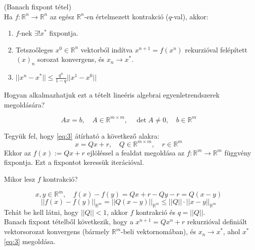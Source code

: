 \begin{tetel}(Banach fixpont tétel) \\
    Ha $f:\mathbb{R}^{n}\to \mathbb{R}^{n}$ az egész $\mathbb{R}^{n}$-en értelmezett kontrakció ($q$-val), akkor:
    \begin{enumerate}
        \item $f$-nek $\exists! x^{*}$ fixpontja.
        \item Tetszoőleges $x^{0} \in \mathbb{R}^{n}$ vektorból indítva $x^{n+1} = f(x^{n})$ rekurzióval felépített $(x)_{n}$ sorozat konvergens, és $x_{n} \to x^{*}$.
        \item $\lvert\lvert x^{n} - x^{*} \rvert\rvert \leq \frac{q^{n}}{1-q} \lvert\lvert x^{1} - x^{0} \rvert\rvert$
    \end{enumerate}
\end{tetel}

\begin{kerdes}
    Hogyan alkalmazhatjuk ezt a tételt lineéris algebrai egyenletrendszerek megoldására?
\end{kerdes}

\begin{equation}\label{eq:3}
    Ax = b, \quad A\in\mathbb{R}^{m\times m}, \quad \det A \neq 0, \quad b \in \mathbb{R}^{m}
\end{equation}

Tegyük fel, hogy \ref{eq:3} átírható a következő alakra:
\begin{equation}\label{eq:4}
    x = Qx + r, \quad Q \in \mathbb{R}^{m\times m}, \quad r \in \mathbb{R}^{m}
\end{equation}
Ekkor az $f(x) := Qx + r$ ejlöléssel a fealdat megoldása az $f:\mathbb{R}^{m}\to \mathbb{R}^{m}$ függvény fixpontja. Ezt a fixpontot keressük iterációval.

\begin{kerdes}
    Mikor lesz $f$ kontrakció?
\end{kerdes}
\begin{equation*}
    x, y \in \mathbb{R}^{m}, \quad f(x) - f(y) = Qx + r - Qy - r = Q(x -y)
\end{equation*}
\begin{equation*}
    \lvert\lvert f(x) - f(y) \rvert\rvert _{\mathbb{R}^{m}} = \lvert\lvert Q(x-y) \rvert\rvert _{\mathbb{R}^{m}} \leq \lvert\lvert Q \rvert\rvert \cdot \lvert\lvert x-y \rvert\rvert _{\mathbb{R}^{m}} 
\end{equation*}
Tehát be kell látni, hogy $\lvert\lvert Q \rvert\rvert < 1$, akkor $f$ kontrakció és $q = \lvert\lvert Q \rvert\rvert$. \\
Banach fixpont tételből következik, hogy a $x^{n+1} = Qx^{n} + r$ rekurzióval definiált vektorsorozat konvergens (bármely $\mathbb{R}^{m}$-beli vektornomában), és $x_{n}\to x^{*}$, ahol $x^{*}$ \ref{eq:3} megoldása.

